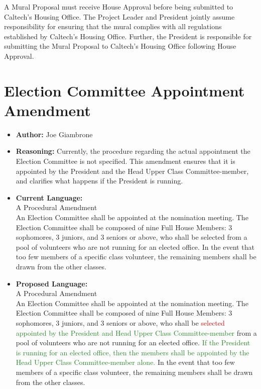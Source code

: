 \documentclass[10pt]{article} %
\newcommand{\add}[1]{\textcolor{ForestGreen}{#1}} %
\newcommand{\del}[1]{\textcolor{red}{#1}} %
\newcommand{\swap}[2]{\del{#1} \add{#2}} %
\begin{document}
\begin{itemize}
        A Mural Proposal must receive House Approval before being submitted to Caltech's Housing Office. The Project Leader and President jointly assume responsibility for ensuring that the mural complies with all regulations established by Caltech's Housing Office. Further, the President is responsible for submitting the Mural Proposal to Caltech's Housing Office following House Approval.
\end{itemize}

\newpage

\section{Election Committee Appointment Amendment}
\begin{itemize}
    \item \textbf{Author:} Joe Giambrone
    \item \textbf{Reasoning:} Currently, the procedure regarding the actual appointment the Election Committee is not specified. This amendment ensures that it is appointed by the President and the Head Upper Class Committee-member, and clarifies what happens if the President is running.
    
    \item \textbf{Current Language:} \\
        A Procedural Amendment \\
        An Election Committee shall be appointed at the nomination meeting. The Election Committee shall be composed of nine Full House Members: 3 sophomores, 3 juniors, and 3 seniors or above, who shall be selected from a pool of volunteers who are not running for an elected office. In the event that too few members of a specific class volunteer, the remaining members shall be drawn from the other classes.

    \item \textbf{Proposed Language:} \\
        A Procedural Amendment \\
        An Election Committee shall be appointed at the nomination meeting. The Election Committee shall be composed of nine Full House Members: 3 sophomores, 3 juniors, and 3 seniors or above, who shall be \swap{selected}{appointed by the President and Head Upper Class Committee-member} from a pool of volunteers who are not running for an elected office. \add{If the President is running for an elected office, then the members shall be appointed by the Head Upper Class Committee-member alone.} In the event that too few members of a specific class volunteer, the  remaining members shall be drawn from the other classes.
\end{itemize}
\end{document}
